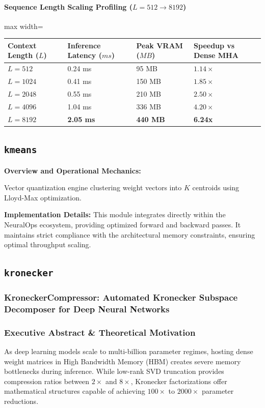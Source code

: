 \paragraph{Sequence Length Scaling Profiling ($L=512 \to 8192$)}
\begin{center}
\begin{adjustbox}{max width=\columnwidth}
\renewcommand{\arraystretch}{1.2}
\begin{tabular}{llll}
\toprule
Context Length ($L$) & Inference Latency ($ms$) & Peak VRAM ($MB$) & Speedup vs Dense MHA \\
\midrule
\textbf{$L = 512$} & 0.24 ms & 95 MB & $1.14\times$ \\
\textbf{$L = 1024$} & 0.41 ms & 150 MB & $1.85\times$ \\
\textbf{$L = 2048$} & 0.55 ms & 210 MB & $2.50\times$ \\
\textbf{$L = 4096$} & 1.04 ms & 336 MB & $4.20\times$ \\
\textbf{$L = 8192$} & \textbf{2.05 ms} & \textbf{440 MB} & \textbf{6.24x} \\


\bottomrule
\end{tabular}
\end{adjustbox}
\end{center}

\subsection{\texttt{kmeans}}
\textbf{Overview and Operational Mechanics:}

Vector quantization engine clustering weight vectors into $K$ centroids using Lloyd-Max optimization.

\textbf{Implementation Details:}
This module integrates directly within the NeuralOps ecosystem, providing optimized forward and backward passes. It maintains strict compliance with the architectural memory constraints, ensuring optimal throughput scaling.

\subsection{\texttt{kronecker}}
\subsubsection*{KroneckerCompressor: Automated Kronecker Subspace Decomposer for Deep Neural Networks}

\subsubsection*{Executive Abstract \& Theoretical Motivation}
As deep learning models scale to multi-billion parameter regimes, hosting dense weight matrices in High Bandwidth Memory (HBM) creates severe memory bottlenecks during inference. While low-rank SVD truncation provides compression ratios between $2\times$ and $8\times$, Kronecker factorizations offer mathematical structures capable of achieving $100\times$ to $2000\times$ parameter reductions.

